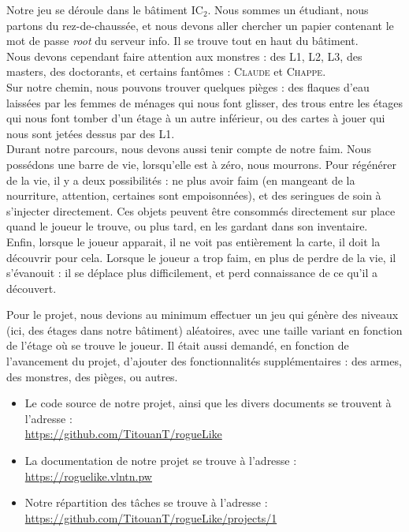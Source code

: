 \documentclass[11pt]{report}
\begin{document}
	Notre jeu se déroule dans le bâtiment IC$_2$. Nous sommes un étudiant, nous partons du rez-de-chaussée, et nous devons aller chercher un papier contenant le mot de passe \emph{root} du serveur info. Il se trouve tout en haut du bâtiment. \\
	Nous devons cependant faire attention aux monstres : des L1, L2, L3, des masters, des doctorants, et certains fantômes : \textsc{Claude} et \textsc{Chappe}.\\
	Sur notre chemin, nous pouvons trouver quelques pièges : des flaques d'eau laissées par les femmes de ménages qui nous font glisser, des trous entre les étages qui nous font tomber d'un étage à un autre inférieur, ou des cartes à jouer qui nous sont jetées dessus par des L1.\\
	Durant notre parcours, nous devons aussi tenir compte de notre faim. Nous possédons une barre de vie, lorsqu'elle est à zéro, nous mourrons. Pour régénérer de la vie, il y a deux possibilités : ne plus avoir faim (en mangeant de la nourriture, attention, certaines sont empoisonnées), et des seringues de soin à s'injecter directement. Ces objets peuvent être consommés directement sur place quand le joueur le trouve, ou plus tard, en les gardant dans son inventaire.\\
	Enfin, lorsque le joueur apparait, il ne voit pas entièrement la carte, il doit la découvrir pour cela. Lorsque le joueur a trop faim, en plus de perdre de la vie, il s'évanouit : il se déplace plus difficilement, et perd connaissance de ce qu'il a découvert.
	
	\vspace{12pt}
	
	Pour le projet, nous devions au minimum effectuer un jeu qui génère des niveaux (ici, des étages dans notre bâtiment) aléatoires, avec une taille variant en fonction de l'étage où se trouve le joueur. Il était aussi demandé, en fonction de l'avancement du projet, d'ajouter des fonctionnalités supplémentaires : des armes, des monstres, des pièges, ou autres.
	
	\vspace{12pt}
	
	\begin{itemize}
	\item Le code source de notre projet, ainsi que les divers documents se trouvent à l'adresse :\\
		\hspace*{1cm} \href{https://github.com/TitouanT/rogueLike}{https://github.com/TitouanT/rogueLike}
	 \item La documentation de notre projet se trouve à l'adresse :\\
	 	\hspace*{1cm} \href{https://roguelike.vlntn.pw}{https://roguelike.vlntn.pw}
	 \item Notre répartition des tâches se trouve à l'adresse :\\
	 	\hspace*{1cm} \href{https://github.com/TitouanT/rogueLike/projects/1}{https://github.com/TitouanT/rogueLike/projects/1}
	\end{itemize}
\end{document}
